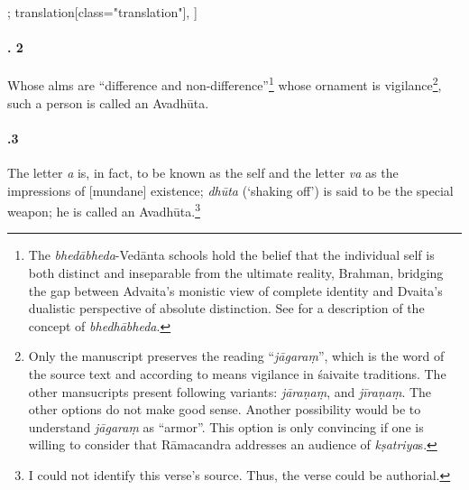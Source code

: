 \begin{alignment}[
  texts=edition[class="edition"];
  translation[class="translation"],
  ]
\begin{translation}
\begin{tlate}[44_2]
      \paragraph{. 2} Whose alms are ``difference and non-difference''\footnote{The \textit{bhedābheda}-Vedānta schools hold the belief that the individual self is both distinct and inseparable from the ultimate reality, Brahman, bridging the gap between Advaita's monistic view of complete identity and Dvaita's dualistic perspective of absolute distinction. See \citeauthor[2023]{bhedabheda} for a description of the concept of \textit{bhedhābheda}.} whose ornament is vigilance\footnote{Only the manuscript  preserves the reading ``\textit{jāgaraṃ}'', which is the word of the source text and according to  \citeauthor[1963:134f.]{brunner1963} means vigilance in śaivaite traditions. The other mansucripts present following variants: \textit{jāraṇaṃ}, and \textit{jīraṇaṃ}. The other options do not make good sense. Another possibility would be to understand \textit{jāgaraṃ} as ``armor''. This option is only convincing if one is willing to consider that Rāmacandra addresses an audience of \textit{kṣatriya}s.}, such a person is called an Avadhūta.%
    \end{tlate}
    \begin{tlate}[44_3]
      \paragraph{.3} The letter \textit{a} is, in fact, to be known as the self and the letter \textit{va} as the impressions of [mundane] existence; \textit{dhūta} (`shaking off') is said to be the special weapon; he is called an Avadhūta.\footnote{I could not identify this verse's source. Thus, the verse could be authorial.}
    \end{tlate}
    \begin{tlate}[44_4]

\end{tlate}
\end{translation}
\end{alignment}

